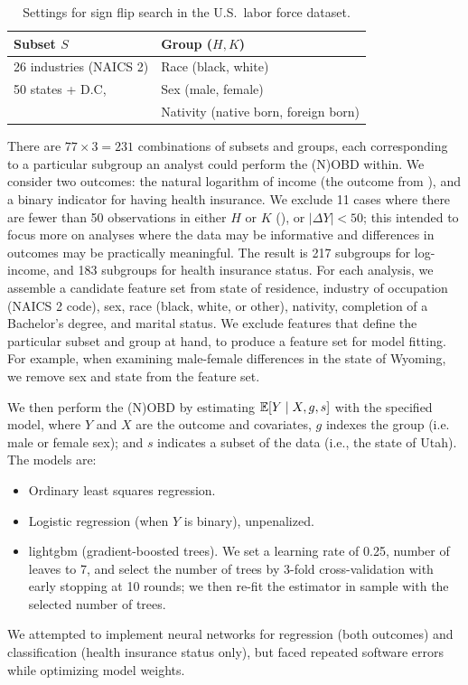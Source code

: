 \begin{table}[!ht]
    \caption{Settings for sign flip search in the U.S.\ labor force dataset.}
    \label{tab:us_census_design}
    \centering
    \footnotesize
    \setlength{\tabcolsep}{4pt}
    \begin{tabular}{@{}ll@{}}
    \toprule
    Subset \( S \) & Group (\( H, K \)) \\
    \midrule
    26 industries (NAICS 2) & Race (black, white)                  \\
    50 states + D.C,        & Sex (male, female)                   \\
                            & Nativity (native born, foreign born) \\
    \bottomrule
    \end{tabular}
\end{table}

There are \( 77 \times 3 = 231 \) combinations of subsets and groups, each corresponding to a particular subgroup an analyst could perform the (N)OBD within.
We consider two outcomes: the natural logarithm of income (the outcome from \citet{bach2024heterogeneity}), and a binary indicator for having health insurance.
We exclude 11 cases where there are fewer than 50 observations in either $H$ or $K$ (), or $|\Delta Y| < 50$; this intended to focus more on analyses where the data may be informative and differences in outcomes may be practically meaningful.
The result is 217 subgroups for log-income, and 183 subgroups for health insurance status.
For each analysis, we assemble a candidate feature set from state of residence, industry of occupation (NAICS 2 code), sex, race (black, white, or other), nativity, completion of a Bachelor's degree, and marital status.
We exclude features that define the particular subset and group at hand, to produce a feature set for model fitting.
For example, when examining male-female differences in the state of Wyoming, we remove sex and state from the feature set.

We then perform the (N)OBD by estimating $\mathbb{E}[Y \mid X, g, s]$ with the specified model, 
where \( Y \) and \( X \) are the outcome and covariates, 
\( g \) indexes the group (i.e. male or female sex);
and \( s \) indicates a subset of the data (i.e., the state of Utah).
The models are:
\begin{itemize}
    \item Ordinary least squares regression.
    \item Logistic regression (when $Y$ is binary), unpenalized.
    \item lightgbm (gradient-boosted trees). We set a learning rate of 0.25, number of leaves to 7, and select the number of trees by 3-fold cross-validation with early stopping at 10 rounds; we then re-fit the estimator in sample with the selected number of trees.
\end{itemize}
We attempted to implement neural networks for regression (both outcomes) and classification (health insurance status only), but faced repeated software errors while optimizing model weights.

